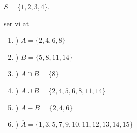 \documentclass[20pt]{article}
\begin{document}
\hfil $S=\{1,2,3,4\}$.


\noindent ser vi at
\begin{enumerate}[label=\alph*]
    \item) $A  = \{ 2,4,6,8 \}$
    \item) $B = \{ 5,8,11,14 \}$
    \item) $A \cap B = \{ 8 \}$
    \item) $A \cup B = \{ 2,4,5,6,8,11,14 \}$
    \item) $A - B = \{ 2,4,6 \}$
    \item) $\overline{A} = \{ 1,3,5,7,9,10,11,12,13,14,15 \}$
\end{enumerate}

	
	
	
	
\end{document}
